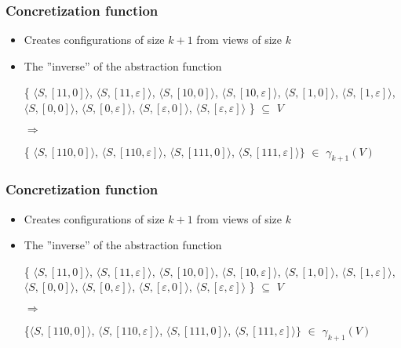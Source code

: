 \documentclass[handout]{beamer}
\begin{document}
\begin{frame}
  \frametitle{Concretization function}
  \begin{itemize}
  \item
    Creates configurations of size $k+1$ from views of size $k$
  \item
    The ''inverse'' of the abstraction function

    \begin{example}[$\gamma$ for ABP with $k=2$]

    \{
    $\langle S, [11, 0]\rangle$,
    {\color{red}$\langle S, [11, \varepsilon]\rangle$},
    $\langle S, [10, 0]\rangle$,
    {\color{red}$\langle S, [10, \varepsilon]\rangle$},
    $\langle S, [1, 0]\rangle$,
    {\color{red}$\langle S, [1,\varepsilon ]\rangle$},
    $\langle S,[0,0]\rangle$,
    {\color{red}$\langle S, [0,\varepsilon]\rangle$},
    $\langle S, [\varepsilon, 0]\rangle$,
    {\color{red}$\langle S, [\varepsilon, \varepsilon]\rangle$}
    \} $\subseteq$ $V$

    $\Rightarrow$

    \{
    $\langle S, [110,0]\rangle$,
    {\color{red}$\langle S, [110,\varepsilon]\rangle$},
    $\langle S, [111,0]\rangle$,
    $\langle S, [111,\varepsilon]\rangle\}$
    $\in$ $\gamma_{k+1}(V)$
    \end{example}
  \end{itemize}
\end{frame}


\begin{frame}
  \frametitle{Concretization function}
  \begin{itemize}
  \item
    Creates configurations of size $k+1$ from views of size $k$
  \item
    The ''inverse'' of the abstraction function

    \begin{example}[$\gamma$ for ABP with $k=2$]

    \{
    {\color{red}$\langle S, [11, 0]\rangle$},
    {\color{red}$\langle S, [11, \varepsilon]\rangle$},
    $\langle S, [10, 0]\rangle$,
    $\langle S, [10, \varepsilon]\rangle$,
    {\color{red}$\langle S, [1, 0]\rangle$},
    {\color{red}$\langle S, [1,\varepsilon ]\rangle$},
    $\langle S,[0,0]\rangle$,
    $\langle S, [0,\varepsilon]\rangle$,
    {\color{red}$\langle S, [\varepsilon, 0]\rangle$},
    {\color{red}$\langle S, [\varepsilon, \varepsilon]\rangle$}
    \} $\subseteq$ $V$

    $\Rightarrow$

    \{$
    \langle S, [110,0]\rangle$,
    $\langle S, [110,\varepsilon]\rangle$,
    {\color{red}$\langle S, [111,0]\rangle$},
    $\langle S, [111,\varepsilon]\rangle\}$
    $\in$ $\gamma_{k+1}(V)$
    \end{example}
  \end{itemize}
\end{frame}
\end{document}
